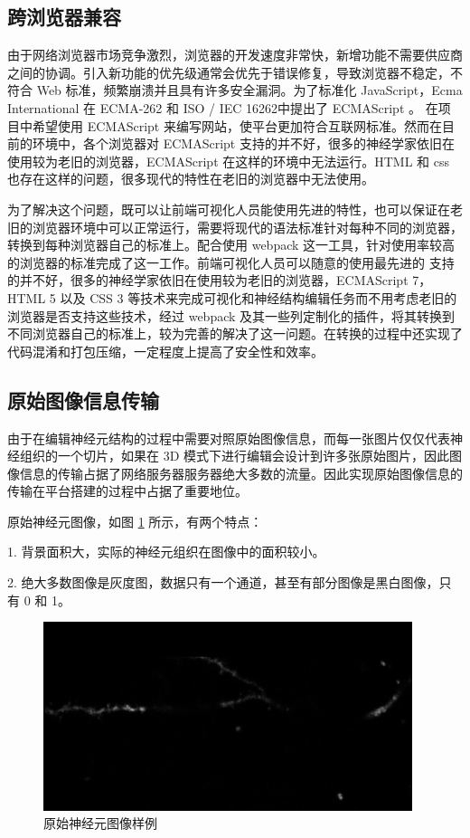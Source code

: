 \subsection{跨浏览器兼容}
由于网络浏览器市场竞争激烈，浏览器的开发速度非常快，新增功能不需要供应商之间的协调。引入新功能的优先级通常会优先于错误修复，导致浏览器不稳定，不符合 Web 标准，频繁崩溃并且具有许多安全漏洞。为了标准化 JavaScript，Ecma International 在 ECMA-262 和 ISO / IEC 16262中提出了 ECMAScript 。 在项目中希望使用 ECMAScript 来编写网站，使平台更加符合互联网标准。然而在目前的环境中，各个浏览器对 ECMAScript 支持的并不好，很多的神经学家依旧在使用较为老旧的浏览器，ECMAScript 在这样的环境中无法运行。HTML 和 css 也存在这样的问题，很多现代的特性在老旧的浏览器中无法使用。

为了解决这个问题，既可以让前端可视化人员能使用先进的特性，也可以保证在老旧的浏览器环境中可以正常运行，需要将现代的语法标准针对每种不同的浏览器，转换到每种浏览器自己的标准上。配合使用 webpack 这一工具，针对使用率较高的浏览器的标准完成了这一工作。前端可视化人员可以随意的使用最先进的 支持的并不好，很多的神经学家依旧在使用较为老旧的浏览器，ECMAScript 7，HTML 5 以及 CSS 3 等技术来完成可视化和神经结构编辑任务而不用考虑老旧的浏览器是否支持这些技术，经过 webpack 及其一些列定制化的插件，将其转换到不同浏览器自己的标准上，较为完善的解决了这一问题。在转换的过程中还实现了代码混淆和打包压缩，一定程度上提高了安全性和效率。

\subsection{原始图像信息传输}
由于在编辑神经元结构的过程中需要对照原始图像信息，而每一张图片仅仅代表神经组织的一个切片，如果在 3D 模式下进行编辑会设计到许多张原始图片，因此图像信息的传输占据了网络服务器服务器绝大多数的流量。因此实现原始图像信息的传输在平台搭建的过程中占据了重要地位。

原始神经元图像，如图 \ref{neu} 所示，有两个特点：

1. 背景面积大，实际的神经元组织在图像中的面积较小。

2. 绝大多数图像是灰度图，数据只有一个通道，甚至有部分图像是黑白图像，只有 0 和 1。

\begin{figure}
\centering
\includegraphics[width=108mm]{images/neu}
\caption{原始神经元图像样例}
\label{neu}
\end{figure}


